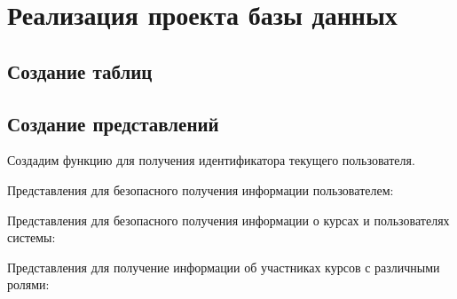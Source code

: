 \documentclass[a4paper,14pt]{article}
\begin{document}
\section{Реализация проекта базы данных}

\subsection{Создание таблиц}

{\small }
{\small }
{\small }
{\small }
{\small }
{\small }
{\small }
{\small }
{\small }
{\small }

\subsection{Создание представлений}

Создадим функцию для получения идентификатора текущего пользователя.

{\small }

Представления для безопасного получения информации пользователем:

{\small }
Представления для безопасного получения информации о курсах и пользователях системы:

{\small }

Представления для получение информации об участниках курсов с различными ролями:

{\small }
\end{document}
